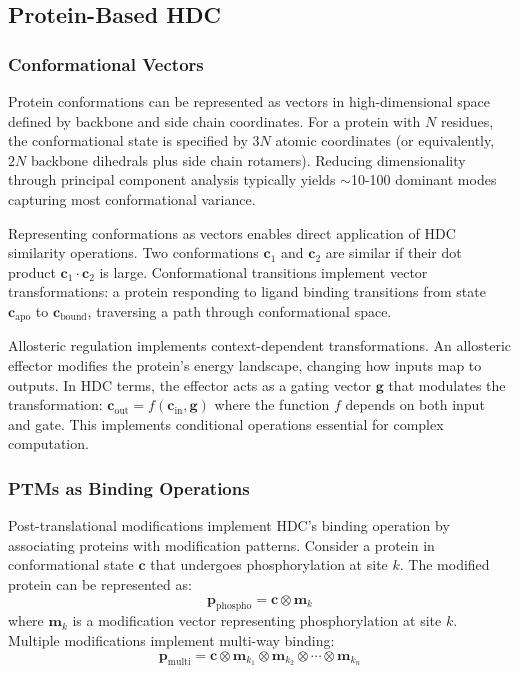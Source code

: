 \documentclass[12pt]{article}
\begin{document}
\subsection{Protein-Based HDC}

\subsubsection{Conformational Vectors}

Protein conformations can be represented as vectors in high-dimensional space defined by backbone and side chain coordinates. For a protein with $N$ residues, the conformational state is specified by $3N$ atomic coordinates (or equivalently, $2N$ backbone dihedrals plus side chain rotamers). Reducing dimensionality through principal component analysis typically yields $\sim$10-100 dominant modes capturing most conformational variance.

Representing conformations as vectors enables direct application of HDC similarity operations. Two conformations $\mathbf{c}_1$ and $\mathbf{c}_2$ are similar if their dot product $\mathbf{c}_1 \cdot \mathbf{c}_2$ is large. Conformational transitions implement vector transformations: a protein responding to ligand binding transitions from state $\mathbf{c}_{\text{apo}}$ to $\mathbf{c}_{\text{bound}}$, traversing a path through conformational space.

Allosteric regulation implements context-dependent transformations. An allosteric effector modifies the protein's energy landscape, changing how inputs map to outputs. In HDC terms, the effector acts as a gating vector $\mathbf{g}$ that modulates the transformation: $\mathbf{c}_{\text{out}} = f(\mathbf{c}_{\text{in}}, \mathbf{g})$ where the function $f$ depends on both input and gate. This implements conditional operations essential for complex computation.

\subsubsection{PTMs as Binding Operations}

Post-translational modifications implement HDC's binding operation by associating proteins with modification patterns. Consider a protein in conformational state $\mathbf{c}$ that undergoes phosphorylation at site $k$. The modified protein can be represented as:
\begin{equation}
\mathbf{p}_{\text{phospho}} = \mathbf{c} \otimes \mathbf{m}_k
\end{equation}
where $\mathbf{m}_k$ is a modification vector representing phosphorylation at site $k$. Multiple modifications implement multi-way binding:
\begin{equation}
\mathbf{p}_{\text{multi}} = \mathbf{c} \otimes \mathbf{m}_{k_1} \otimes \mathbf{m}_{k_2} \otimes \cdots \otimes \mathbf{m}_{k_n}
\end{equation}
\end{document}
